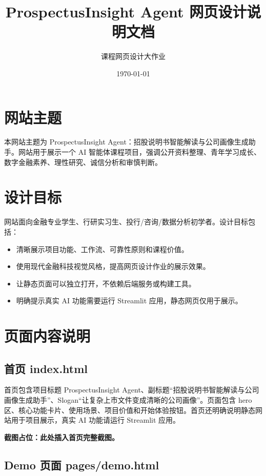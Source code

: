 \documentclass[UTF8,a4paper,12pt]{ctexart}
\title{\textbf{ProspectusInsight Agent 网页设计说明文档}}
\author{课程网页设计大作业}
\date{\today}
\begin{document}
\maketitle

\section{网站主题}

本网站主题为 ProspectusInsight Agent：招股说明书智能解读与公司画像生成助手。网站用于展示一个 AI 智能体课程项目，强调公开资料整理、青年学习成长、数字金融素养、理性研究、诚信分析和审慎判断。

\section{设计目标}

网站面向金融专业学生、行研实习生、投行/咨询/数据分析初学者。设计目标包括：

\begin{itemize}[leftmargin=2em]
  \item 清晰展示项目功能、工作流、可靠性原则和课程价值。
  \item 使用现代金融科技视觉风格，提高网页设计作业的展示效果。
  \item 让静态页面可以独立打开，不依赖后端服务或构建工具。
  \item 明确提示真实 AI 功能需要运行 Streamlit 应用，静态网页仅用于展示。
\end{itemize}

\section{页面内容说明}

\subsection{首页 index.html}

首页包含项目标题 ProspectusInsight Agent、副标题“招股说明书智能解读与公司画像生成助手”、Slogan“让复杂上市文件变成清晰的公司画像”。页面包含 hero 区、核心功能卡片、使用场景、项目价值和开始体验按钮。首页还明确说明静态网站用于项目展示，真实 AI 功能请运行 Streamlit 应用。

\textbf{截图占位：此处插入首页完整截图。}

\subsection{Demo 页面 pages/demo.html}
\end{document}
